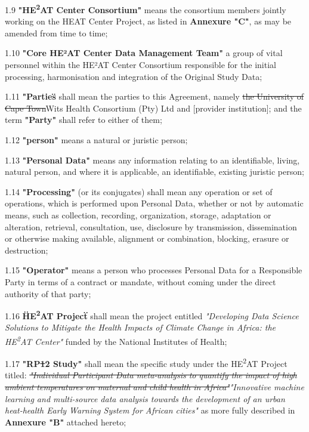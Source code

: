 \documentclass[12pt,letterpaper]{article}
\newcommand{\deleted}[1]{\textcolor{deletecolor}{\sout{#1}}}
\newcommand{\added}[1]{\textcolor{addcolor}{#1}}
\begin{document}
1.9 \textbf{"HE\textsuperscript{2}AT Center Consortium"} means the consortium members jointly working on the HEAT Center Project, as listed in \textbf{Annexure "C"}, as may be amended from time to time;

1.10 \textbf{"Core HE²AT Center Data Management Team"} a group of \added{vital} personnel within the HE²AT Center Consortium responsible for the initial processing, harmonisation and integration of the Original Study Data;

1.11 \textbf{"Parties\"} shall mean the parties to this Agreement, namely \deleted{the University of Cape Town}\added{Wits Health Consortium (Pty) Ltd} and [provider institution]; and the term \textbf{"Party"} shall refer to either of them;

1.12 \textbf{"person"} means a natural or juristic person;

1.13 \textbf{"Personal Data"} means any information relating to an identifiable, living, natural person, and where it is applicable, an identifiable, existing juristic person;

1.14 \textbf{"Processing"} (or its conjugates) shall mean any operation or set of operations, which is performed upon Personal Data, whether or not by automatic means, such as collection, recording, organization, storage, adaptation or alteration, retrieval, consultation, use, disclosure by transmission, dissemination or otherwise making available, alignment or combination, blocking, erasure or destruction;

1.15 \textbf{"Operator"} means a person who processes Personal Data for a Responsible Party in terms of a contract or mandate, without coming under the direct authority of that party;

1.16 \textbf{\"HE\textsuperscript{2}AT Project\"} shall mean the project entitled \textit{"Developing Data Science Solutions to Mitigate the Health Impacts of Climate Change in Africa: the HE\textsuperscript{2}AT Center"} funded by the National Institutes of Health;

1.17 \textbf{"RP\deleted{1}\added{2} Study"} shall mean the specific study under the HE\textsuperscript{2}AT Project titled: \deleted{\textit{"Individual Participant Data meta-analysis to quantify the impact of high ambient temperatures on maternal and child health in Africa"}}\added{\textit{"Innovative machine learning and multi-source data analysis towards the development of an urban heat-health Early Warning System for African cities"}} as more fully described in \textbf{Annexure "B"} attached hereto;
\end{document}
